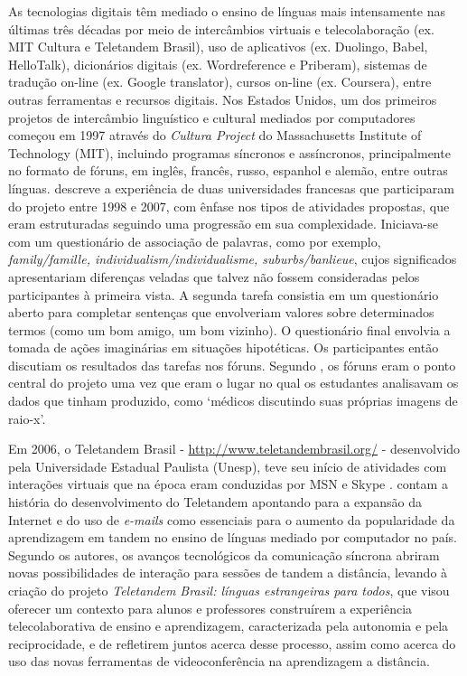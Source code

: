 \documentclass[portuguese]{textolivre}
\begin{document}
As tecnologias digitais têm mediado o ensino de línguas mais intensamente nas últimas três décadas por meio de intercâmbios virtuais e telecolaboração (ex. MIT Cultura e Teletandem Brasil), uso de aplicativos (ex. Duolingo, Babel, HelloTalk), dicionários digitais (ex. Wordreference e Priberam), sistemas de tradução on-line (ex. Google translator), cursos on-line (ex. Coursera), entre outras ferramentas e recursos digitais. Nos Estados Unidos, um dos primeiros projetos de intercâmbio linguístico e cultural mediados por computadores começou em 1997 através do \textit{Cultura Project} do Massachusetts Institute of Technology (MIT), incluindo programas síncronos e assíncronos, principalmente no formato de fóruns, em inglês, francês, russo, espanhol e alemão, entre outras línguas. \textcite{english_going_2023} descreve a experiência de duas universidades francesas que participaram do projeto entre 1998 e 2007, com ênfase nos tipos de atividades propostas, que eram estruturadas seguindo uma progressão em sua complexidade. Iniciava-se com um questionário de associação de palavras, como por exemplo, \textit{family/famille, individualism/individualisme, suburbs/banlieue}, cujos significados apresentariam diferenças veladas que talvez não fossem consideradas pelos participantes à primeira vista. A segunda tarefa consistia em um questionário aberto para completar sentenças que envolveriam valores sobre determinados termos (como um bom amigo, um bom vizinho). O questionário final envolvia a tomada de ações imaginárias em situações hipotéticas. Os participantes então discutiam os resultados das tarefas nos fóruns. Segundo \textcite[p. 31]{english_going_2023}, os fóruns eram o ponto central do projeto uma vez que eram o lugar no qual os estudantes analisavam os dados que tinham produzido, como ‘médicos discutindo suas próprias imagens de raio-x’. 

Em 2006, o Teletandem Brasil - \url{http://www.teletandembrasil.org/} - desenvolvido pela Universidade Estadual Paulista (Unesp), teve seu início de atividades com interações virtuais que na época eram conduzidas por MSN e Skype \cite{telles_teletandem_2009}. \textcite{telles_foreign_2006} contam a história do desenvolvimento do Teletandem apontando para a expansão da Internet e do uso de \textit{e-mails} como essenciais para o aumento da popularidade da aprendizagem em tandem no ensino de línguas mediado por computador no país. Segundo os autores, os avanços tecnológicos da comunicação síncrona abriram novas possibilidades de interação para sessões de tandem a distância, levando à criação do projeto \textit{Teletandem Brasil: línguas estrangeiras para todos}, que visou oferecer um contexto para alunos e professores construírem a experiência telecolaborativa de ensino e aprendizagem, caracterizada pela autonomia e pela reciprocidade, e de refletirem juntos acerca desse processo, assim como acerca do uso das novas ferramentas de videoconferência na aprendizagem a distância. 
\end{document}
